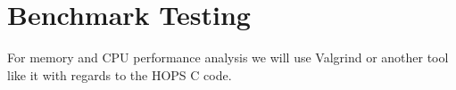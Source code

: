 %
%
\section{Benchmark Testing}
\label{sec:benchmark}

For memory and CPU performance analysis we will use Valgrind or another tool like it with regards to the HOPS C code.

%
%
